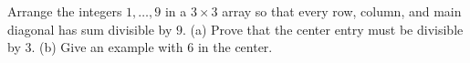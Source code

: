 Arrange the integers $1,\ldots,9$ in a $3\times3$ array so that every row, column, and main diagonal has sum divisible by $9$.
(a) Prove that the center entry must be divisible by $3$.
(b) Give an example with $6$ in the center.
